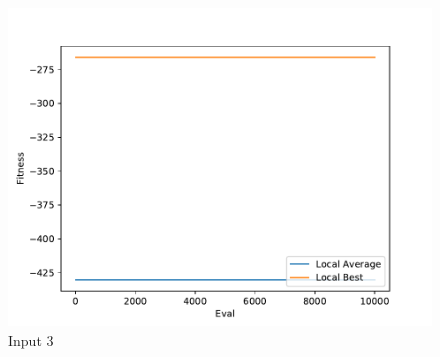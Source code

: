 \documentclass{standalone}
\begin{document}
\begin{figure}[!htb]
	\caption{Input 3}
	\label{fig:graph_3023}
	\includegraphics[width=\textwidth]{../graphs/graphs/3023.pdf}
\end{figure}
\end{document}
